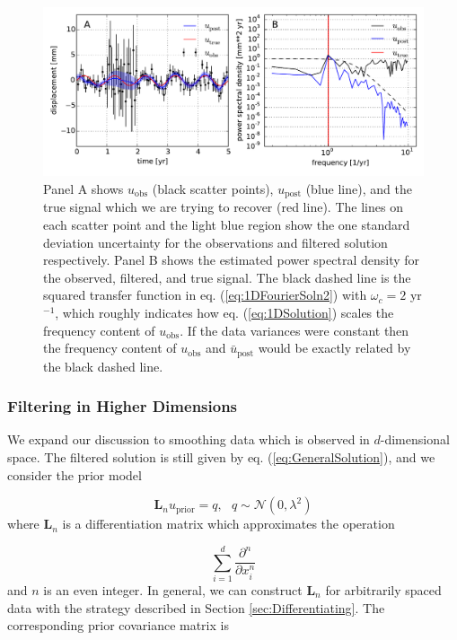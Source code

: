\documentclass[10pt,a4paper]{article}
\begin{document}
\begin{figure}
\includegraphics[scale=0.75]{figures/fig1}
\caption{Panel A shows $u_\mathrm{obs}$ (black scatter points), $u_\mathrm{post}$ (blue line), and the true signal which we are trying to recover (red line).  The lines on each scatter point and the light blue region show the one standard deviation uncertainty for the observations and filtered solution respectively. Panel B shows the estimated power spectral density for the observed, filtered, and true signal.  The black dashed line is the squared transfer function in eq. (\ref{eq:1DFourierSoln2}) with $\omega_c=2$ yr$^{-1}$, which roughly indicates how eq. (\ref{eq:1DSolution}) scales the frequency content of $u_\mathrm{obs}$.  If the data variances were constant then the frequency content of $u_\mathrm{obs}$ and $\bar{u}_\mathrm{post}$ would be exactly related by the black dashed line.}   
\label{fig:Demo1}
\end{figure}


\subsubsection{Filtering in Higher Dimensions}\label{sec:SmoothingND} 
We expand our discussion to smoothing data which is observed in $d$-dimensional space.  The filtered solution is still given by eq. (\ref{eq:GeneralSolution}), and we consider the prior model

\begin{equation}
  \mathbf{L}_n u_\mathrm{prior} = q, \ \ \ q \sim \mathcal{N}(0,\lambda^2)
\end{equation}  
where $\mathbf{L}_n$ is a differentiation matrix which approximates the operation 

\begin{equation}
  \sum_{i=1}^d\frac{\partial^n}{\partial x_i^n} 
\end{equation} 
and $n$ is an even integer. In general, we can construct $\mathbf{L}_n$ for arbitrarily spaced data with the strategy described in Section \ref{sec:Differentiating}. The corresponding prior covariance matrix is
\end{document}
